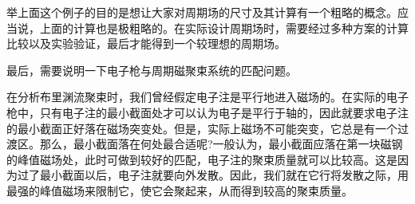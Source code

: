 举上面这个例子的目的是想让大家对周期场的尺寸及其计算有一个粗略的概念。应当说，上面的计算也是极粗略的。在实际设计周期场时，需要经过多种方案的计算比较以及实验验证，最后才能得到一个较理想的周期场。


最后，需要说明一下电子枪与周期磁聚束系统的匹配问题。


在分析布里渊流聚束时，我们曾经假定电子注是平行地进入磁场的。在实际的电子枪中，只有电子注的最小截面处才可以认为电子是平行于轴的，因此就要求电子注的最小截面正好落在磁场突变处。但是，实际上磁场不可能突变，它总是有一个过渡区。那么，最小截面落在何处最合适呢?一般认为，最小截面应落在第一块磁钢的峰值磁场处，此时可做到较好的匹配，电子注的聚束质量就可以比较高。这是因为过了最小截面以后，电子注就要向外发散。因此，我们就在它行将发散之际，用最强的峰值磁场来限制它，使它会聚起来，从而得到较高的聚束质量。








